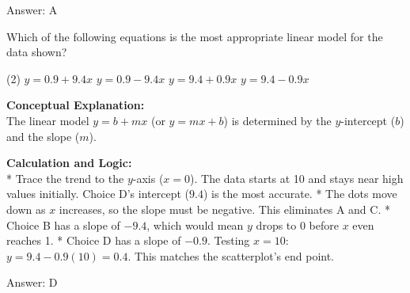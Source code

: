 \documentclass[11pt,paper=a4,answers]{exam}
\begin{document}
\begin{questions}
\begin{solution}
Answer: \colorbox{yellow!100}{A}
\end{solution}

\vspace{60pt}

\question
\begin{center}
\end{center}
Which of the following equations is the most appropriate linear model for the data shown?
\begin{tasks}(2)
    \task $y = 0.9 + 9.4x$
    \task $y = 0.9 - 9.4x$
    \task $y = 9.4 + 0.9x$
    \task $y = 9.4 - 0.9x$
\end{tasks}

\begin{solution}
\textbf{Conceptual Explanation:} \\
The linear model $y = b + mx$ (or $y = mx + b$) is determined by the $y$-intercept ($b$) and the slope ($m$).

\vspace{30pt}

\textbf{Calculation and Logic:} \\
* Trace the trend to the $y$-axis ($x=0$). The data starts at 10 and stays near high values initially. Choice D's intercept ($9.4$) is the most accurate.
* The dots move down as $x$ increases, so the slope must be negative. This eliminates A and C.
* Choice B has a slope of $-9.4$, which would mean $y$ drops to 0 before $x$ even reaches 1.
* Choice D has a slope of $-0.9$. Testing $x=10$: $y = 9.4 - 0.9(10) = 0.4$. This matches the scatterplot's end point.

\vspace{30pt}

Answer: \colorbox{yellow!100}{D}
\end{solution}

\vspace{60pt}


\end{questions}
\end{document}
